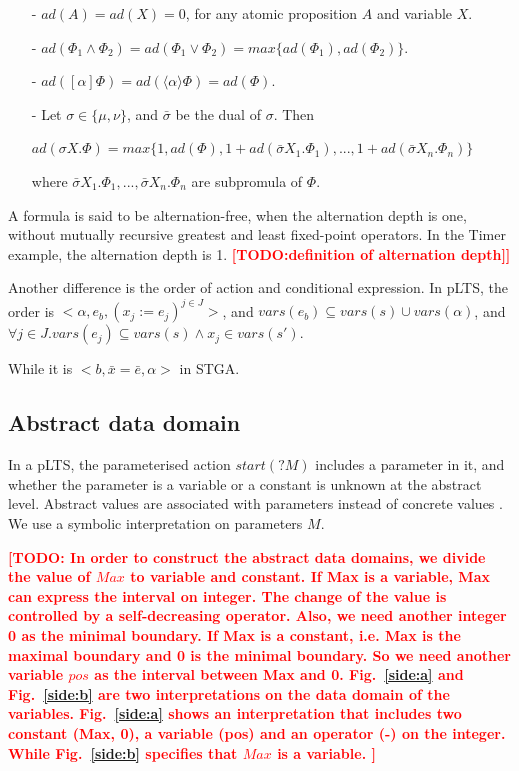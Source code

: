 \documentclass[runningheads,a4paper]{llncs}
\newcommand{\TODO}[1]{\textcolor{red}{\textbf{[TODO:#1]}}}
\begin{document}
\begin{itemize}
\item[-] $ad(A) = ad(X) = 0$, for any atomic proposition $A$ and variable $X$.
\item[-] $ad(\Phi_{1}\wedge\Phi_{2}) = ad(\Phi_{1}\vee\Phi_{2}) = max\{ ad(\Phi_{1}), ad(\Phi_{2})\}$.
\item[-] $ad([\alpha]\Phi) = ad(\langle\alpha\rangle\Phi) = ad(\Phi)$.
\item[-] Let $\sigma\in\{\mu,\nu\}$, and $\bar{\sigma}$ be the dual of $\sigma$. Then
	\begin{center}
	$ad(\sigma X.\Phi) = max\{1, ad(\Phi), 1+ad(\bar{\sigma} X_{1}.\Phi_{1}), ... , 1+ ad(\bar{\sigma} X_{n}.\Phi_{n})\}$
	\end{center} 
	where $\bar{\sigma} X_{1}.\Phi_{1}, ... , \bar{\sigma} X_{n}.\Phi_{n}$ are subpromula of $\Phi$.
\end{itemize}

A formula is said to be alternation-free, when the alternation depth is one, without mutually recursive greatest and least fixed-point operators. In the Timer example, the alternation depth is 1. \TODO{definition of alternation depth]}

 {\color{red}{The order of action and conditional expression???}}
Another difference is the order of action and conditional expression. In pLTS, the order is $<\alpha, e_{b}, (x_{j}:=e_{j})^{j\in J}>$,  and $vars(e_{b})\subseteq vars(s)\cup vars(\alpha)$, and $\forall j\in J. vars(e_{j})\subseteq vars(s)\wedge x_{j}\in vars(s')$. 

While it is $< b, \bar{x}=\bar{e}, \alpha>$ in STGA.


\subsection{Abstract data domain}

In a pLTS, the parameterised action $start(?M)$ includes a parameter in it, and whether the parameter is a variable or a constant is unknown at the abstract level. Abstract values are associated with parameters instead of concrete values \cite{cousot1976static}. We use a symbolic interpretation on parameters $M$. 


\TODO{
In order to construct the abstract data domains, we divide the value of $Max$ to variable and constant. If Max is a variable, Max can express the interval on integer. The change of the value is controlled by a self-decreasing operator. Also, we need another integer 0 as the minimal boundary. If Max is a constant, i.e. Max is the maximal boundary and 0 is the minimal boundary. So we need another variable $pos$ as the interval between Max and 0. Fig.~\ref{side:a} and Fig.~\ref{side:b} are two interpretations on the data domain of the variables. Fig.~\ref{side:a} shows an interpretation that includes two constant (Max, 0), a variable (pos) and an operator (-) on the integer. While Fig.~\ref{side:b} specifies that $Max$ is a variable.
}
\end{document}
